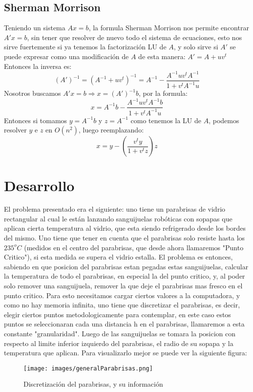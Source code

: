 \documentclass[a4paper]{article}
\begin{document}
\subsection{Sherman Morrison}
Teniendo un sistema $Ax = b$, la formula Sherman Morrison nos permite encontrar $A'x = b$, sin tener que resolver de nuevo todo el sistema de ecuaciones, esto nos sirve fuertemente si ya tenemos la factorización LU de $A$, y solo sirve si $A'$ se puede expresar como una modificación de $A$ de esta manera: $A'=A+uv^t$
Entonces la inversa es:
\[(A')^{-1} = (A^{-1} + uv^t)^{-1} = A^{-1} - \frac{A^{-1}uv^tA^{-1}}{1 + v^tA^{-1} u}\]
Nosotros buscamos $A'x = b \Rightarrow  x = (A')^{-1}b$, por la formula:
\[x = A^{-1}b - \frac{A^{-1}uv^tA^{-1}b}{1 + v^tA^{-1} u}\]
Entonces si tomamos $y = A^{-1}b$ y $z = A^{-1}$ como tenemos la LU de $A$, podemos resolver $y$ e $z$ en $O(n^2)$, luego reemplazando:
\[x = y - (\frac{v^ty}{1 + v^tz})z\]
\newpage 

\section{Desarrollo}
El problema presentado era el siguiente: uno tiene un parabrisas de vidrio rectangular al cual le están lanzando sanguijuelas robóticas con sopapas que aplican cierta temperatura al vidrio, que esta siendo refrigerado desde los bordes del mismo. Uno tiene que tener en cuenta que el parabrisas solo resiste hasta los $235^oC$ (medidos en el centro del parabrisas, que desde ahora llamaremos "Punto Critico"), si esta medida se supera el vidrio estalla. El problema es entonces, sabiendo en que posicion del parabrisas estan pegadas estas sanguijuelas, calcular la temperatura de todo el parabrisas, en especial la del punto critico, y, al poder solo remover una sanguijuela, remover la que deje el parabrisas mas fresco en el punto critico. Para esto necesitamos cargar ciertos valores a la computadora, y como no hay memoria infinita, uno tiene que discretizar el parabrisas, es decir, elegir ciertos puntos metodologicamente para contemplar, en este caso estos puntos se seleccionaran cada una distancia h en el parabrisas, llamaremos a esta constante "granularidad". Luego de las sanguijuelas se tomara la posicion con respecto al limite inferior izquierdo del parabrisas, el radio de su sopapa y la temperatura que aplican. Para visualizarlo mejor se puede ver la siguiente figura:

\begin{figure}[H]
\centering
\texttt{[image: images/generalParabrisas.png]}
\caption{Discretización del parabrisas, y su información}
\label{parabrisas}
\end{figure}
\end{document}
